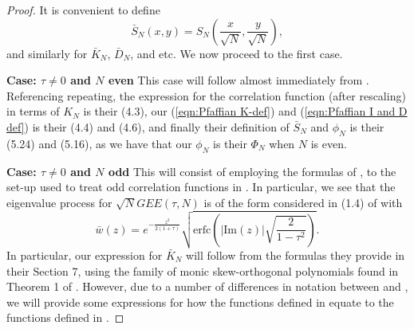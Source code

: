 \documentclass[12pt]{article}
\numberwithin{info}{section}
\numberwithin{equation}{section}
\renewcommand{\[}{\begin{equation}}
\renewcommand{\]}{\end{equation}}
\newcommand{\sq}{\sqrt}
\newcommand{\<}{\langle}
\renewcommand{\>}{\rangle}
\renewcommand{\sq}{\sqrt}
\renewcommand{\Im}{\mathrm{Im}}
\renewcommand{\Im}{\mathrm{Im}}
\newcommand{\erfc}{\mathrm{erfc}}
\newcommand{\Sb}{\bar{S}}
\begin{document}
	\begin{proof}
		It is convenient to define
		\[\bar{S}_N\left(x,y\right)=S_N\left(\frac{x}{\sqrt{N}},\frac{y}{\sqrt{N}}\right),\]
		and similarly for $\bar{K}_N$, $\bar{D}_N$, and etc. We now proceed to the first case.
		
		\textbf{Case: $\tau\neq 0$ and $N$ even } 
		This case will follow almost immediately from \cite{forrester-elliptic}. Referencing \cite{forrester-elliptic} repeating, the expression for the correlation function (after rescaling) in terms of $K_N$ is their (4.3), our (\ref{eqn:Pfaffian K-def}) and (\ref{eqn:Pfaffian I and D def}) is their (4.4) and (4.6), and finally their definition of $\Sb_N$ and $\phi_N$ is their (5.24) and (5.16), as we have that our $\phi_N$ is their $\Phi_N$ when $N$ is even.
		
		\textbf{Case: $\tau\neq 0$ and $N$ odd} This will consist of employing the formulas of \cite{forrester-elliptic}, to the set-up used to treat odd correlation functions in \cite{sinclair}. In particular, we see that the eigenvalue process for $\sqrt{N}GEE(\tau,N)$ is of the form considered in (1.4) of \cite{sinclair} with
		\[\bar{w}(z)=e^{-\frac{z^2}{2(1+\tau)}}\sq{\erfc \left(|\Im(z)|\sq{\frac{2}{1-\tau^2}} \right)}.\]
		In particular, our expression for $\bar{K}_N$ will follow from the formulas they provide in their Section 7, using the family of monic skew-orthogonal polynomials found in Theorem 1 of \cite{forrester-elliptic}. However, due to a number of differences in notation between \cite{forrester-elliptic} and \cite{sinclair}, we will provide some expressions for how the functions defined in \cite{forrester-elliptic} equate to the functions defined in \cite{sinclair}. 
		

\end{proof}
\end{document}
